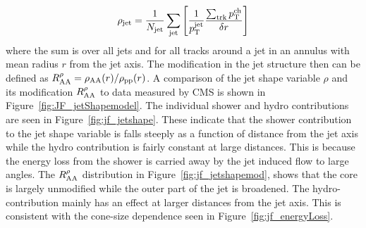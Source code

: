 \begin{align}
\rho_{\rm jet} = \frac{1}{\mbox{$N_{\mathrm{jet}}$}} \sum_{\rm jet} \left[ \frac{1}{\mbox{$p_{\mathrm{T}}^{\mathrm{jet}}$}} \frac{\sum_{\rm trk} \mbox{$p_{\mathrm{T}}^{\mathrm{ch}}$}}{\delta r}  \right]
\end{align}
where the sum is over all jets and for all tracks around a jet in an annulus with mean radius $r$ from the jet axis.
The modification in the jet structure then can be defined as $R_{\rm AA}^\rho = \rho_{\rm AA} (r) / \rho_{\rm pp} (r) $.
%
A comparison of the jet shape variable $\rho$ and its modification $R_{\rm AA}^\rho$ to data measured by CMS is shown in Figure~\ref{fig:JF_jetShapemodel}.
The individual shower and hydro contributions are seen in Figure~\ref{fig:jf_jetshape}.
These indicate that the shower contribution to the jet shape variable is falls steeply as a function of distance from the jet axis while the hydro contribution is fairly constant at large distances.
This is because the energy loss from the shower is carried away by the jet induced flow to large angles.
The $R_{\rm AA}^\rho$ distribution in Figure~\ref{fig:jf_jetshapemod}, shows that the core is largely unmodified while the outer part of the jet is broadened.
The hydro-contribution mainly has an effect at larger distances from the jet axis.
This is consistent with the cone-size dependence seen in Figure~\ref{fig:jf_energyLoss}.


